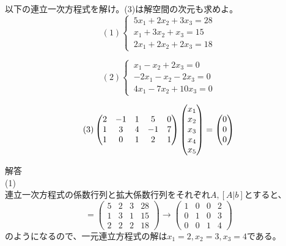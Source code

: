 \documentclass{jlreq}
\begin{document}
\begin{problem}
  以下の連立一次方程式を解け。(3)は解空間の次元も求めよ。
  \begin{equation*}
    (1)  \left\{ \,
    \begin{aligned}
      5x_1 + 2x_2 + 3 x_3 = 28 \\
      x_1 + 3 x_2 + x_3 = 15 \\
      2x_1 + 2x_2 + 2 x_3 = 18
    \end{aligned}
\right.
  \end{equation*}

  \begin{equation*}
    (2) \left\{ \,
    \begin{aligned}
      x_1 - x_2 + 2 x_3 = 0 \\
      -2x_1 - x_2 - 2 x_3 = 0 \\
      4x_1 - 7x_2 + 10 x_3 = 0
    \end{aligned}
\right.
  \end{equation*}

  \begin{equation*}
    (3) \\
    \begin{pmatrix}
      2 & -1 & 1 & 5 & 0 \\
      1 & 3 & 4 & -1 & 7 \\
      1 & 0 & 1 & 2 & 1 \\
    \end{pmatrix} \begin{pmatrix}
      x_1 \\ x_2 \\ x_3 \\ x_4 \\ x_5
    \end{pmatrix} = \begin{pmatrix}
      0 \\ 0 \\ 0
    \end{pmatrix}
  \end{equation*}
  \dotfill

  解答 \\
  (1) \\
  連立一次方程式の係数行列と拡大係数行列をそれぞれ$A, [A|b]$とすると、
  \begin{equation*}
    [A|b] = \begin{pmatrix}
      5 & 2 & 3 & 28 \\
      1 & 3 & 1 & 15 \\
      2 & 2 & 2 & 18
    \end{pmatrix} \to \begin{pmatrix}
      1 & 0 & 0 & 2 \\
      0 & 1 & 0 & 3 \\
      0 & 0 & 1 & 4
    \end{pmatrix}
  \end{equation*}
  のようになるので、一元連立方程式の解は$x_1 = 2, x_2 = 3, x_3 = 4$である。


\end{problem}
\end{document}
